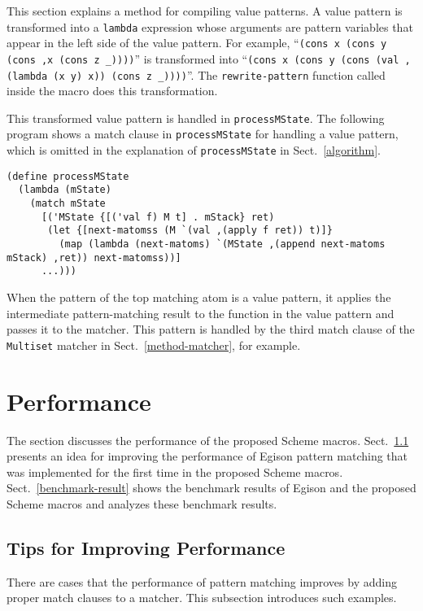 \documentclass[acmlarge]{acmart}
\newcommand{\new}[1]{\textcolor{blue}{#1}}
\begin{document}
This section explains a method for compiling value patterns.
A value pattern is transformed into a \lstinline{lambda} expression whose arguments are pattern variables that appear in the left side of the value pattern.
For example, ``\lstinline{(cons x (cons y (cons ,x (cons z _))))}'' is transformed into ``\lstinline{(cons x (cons y (cons (val ,(lambda (x y) x)) (cons z _))))}''.
The \lstinline{rewrite-pattern} function called inside the macro does this transformation.

This transformed value pattern is handled in \lstinline{processMState}.
The following program shows a match clause in \lstinline{processMState} for handling a value pattern, which is omitted in the explanation of \lstinline{processMState} in Sect.~\ref{algorithm}.

\begin{lstlisting}[language=egison]
(define processMState
  (lambda (mState)
    (match mState
      [('MState {[('val f) M t] . mStack} ret)
       (let {[next-matomss (M `(val ,(apply f ret)) t)]}
         (map (lambda (next-matoms) `(MState ,(append next-matoms mStack) ,ret)) next-matomss))]
      ...)))
\end{lstlisting}

\noindent
When the pattern of the top matching atom is a value pattern, it applies the intermediate pattern-matching result to the function in the value pattern and passes it to the matcher.
This pattern is handled by the third match clause of the \lstinline{Multiset} matcher in Sect.~\ref{method-matcher}, for example.

\section{Performance}\label{performance}

The section discusses the performance of the proposed Scheme macros.
Sect.~\ref{tip} presents an idea for improving the performance of Egison pattern matching that was implemented for the first time in the proposed Scheme macros.
Sect.~\ref{benchmark-result} shows the benchmark results of Egison and the proposed Scheme macros and analyzes these benchmark results.

\subsection{Tips for Improving Performance}\label{tip}

There are cases that the performance of pattern matching improves by adding proper match clauses to a matcher.
This subsection introduces such examples.
\end{document}
